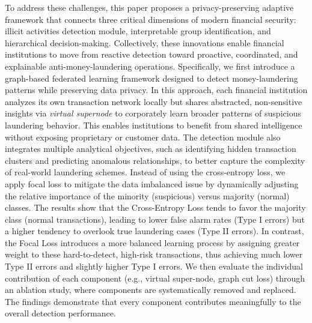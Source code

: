 \documentclass[11pt,english]{article}
\begin{document}
To address these challenges, this paper proposes a privacy-preserving adaptive framework that connects three critical dimensions of modern financial security: illicit activities detection module, interpretable group identification, and hierarchical decision-making. Collectively, these innovations enable financial institutions to move from reactive detection toward proactive, coordinated, and explainable anti-money-laundering operations. Specifically, we first introduce a graph-based federated learning framework designed to detect money-laundering patterns while preserving data privacy. In this approach, each financial institution analyzes its own transaction network locally but shares abstracted, non-sensitive insights via \textit{virtual supernode} to corporately learn broader patterns of suspicious laundering behavior. This enables institutions to benefit from shared intelligence without exposing proprietary or customer data. The detection module also integrates multiple analytical objectives, such as identifying hidden transaction clusters and predicting anomalous relationships, to better capture the complexity of real-world laundering schemes. Instead of using the cross-entropy loss, we apply focal loss to mitigate the data imbalanced issue by dynamically adjusting the relative importance of the minority (suspicious) versus majority (normal) classes. The results show that the Cross-Entropy Loss tends to favor the majority class (normal transactions), leading to lower false alarm rates (Type I errors) but a higher tendency to overlook true laundering cases (Type II errors). In contrast, the Focal Loss introduces a more balanced learning process by assigning greater weight to these hard-to-detect, high-risk transactions, thus achieving much lower Type II errors and slightly higher Type I errors. We then evaluate the individual contribution of each component (e.g., virtual super-node, graph cut loss) through an ablation study, where components are systematically removed and replaced. The findings demonstrate that every component contributes meaningfully to the overall detection performance.
\end{document}
